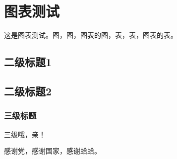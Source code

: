 \documentclass[truetimes, print]{xjtubsc}
\begin{document}
\section{图表测试}
这是图表测试。图，图，图表的图，表，表，图表的表。
\subsection{二级标题1}
\subsection{二级标题2}
\subsubsection{三级标题}
三级哦，亲！



\backmatter













\begin{acknowledgment}
感谢党，感谢国家，感谢蛤蛤。
\end{acknowledgment}
\end{document}
